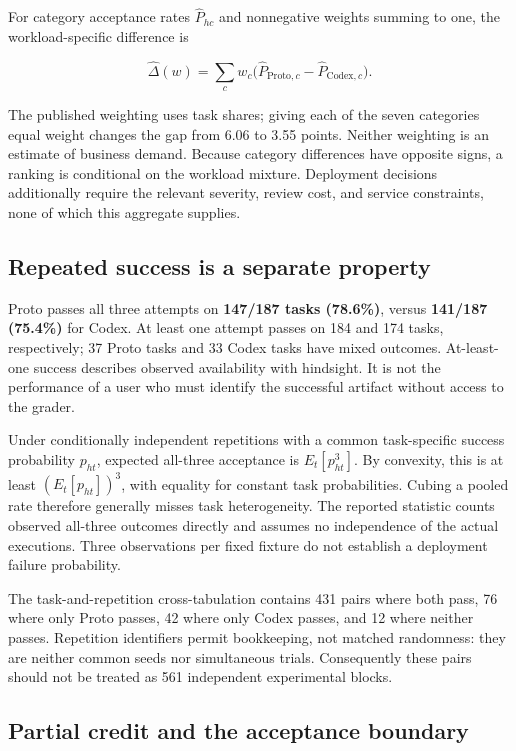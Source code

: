 For category acceptance rates \(\widehat P_{hc}\) and nonnegative weights summing to one, the workload-specific difference is

\[
\widehat\Delta(w)=\sum_c w_c
\bigl(\widehat P_{\mathrm{Proto},c}-\widehat P_{\mathrm{Codex},c}\bigr).
\]

The published weighting uses task shares; giving each of the seven categories equal weight changes the gap from 6.06 to 3.55 points. Neither weighting is an estimate of business demand. Because category differences have opposite signs, a ranking is conditional on the workload mixture. Deployment decisions additionally require the relevant severity, review cost, and service constraints, none of which this aggregate supplies.

\subsection{Repeated success is a separate property}\label{repeated-success-is-a-separate-property}



Proto passes all three attempts on \textbf{147/187 tasks (78.6\%)}, versus \textbf{141/187 (75.4\%)} for Codex. At least one attempt passes on 184 and 174 tasks, respectively; 37 Proto tasks and 33 Codex tasks have mixed outcomes. At-least-one success describes observed availability with hindsight. It is not the performance of a user who must identify the successful artifact without access to the grader.

Under conditionally independent repetitions with a common task-specific success probability \(p_{ht}\), expected all-three acceptance is \(E_t[p_{ht}^{3}]\). By convexity, this is at least \((E_t[p_{ht}])^3\), with equality for constant task probabilities. Cubing a pooled rate therefore generally misses task heterogeneity. The reported statistic counts observed all-three outcomes directly and assumes no independence of the actual executions. Three observations per fixed fixture do not establish a deployment failure probability.

The task-and-repetition cross-tabulation contains 431 pairs where both pass, 76 where only Proto passes, 42 where only Codex passes, and 12 where neither passes. Repetition identifiers permit bookkeeping, not matched randomness: they are neither common seeds nor simultaneous trials. Consequently these pairs should not be treated as 561 independent experimental blocks.

\subsection{Partial credit and the acceptance boundary}\label{partial-credit-and-the-acceptance-boundary}

